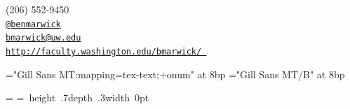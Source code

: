 \documentclass[11pt,article,oneside,oldfontcommands]{memoir}
\makeatletter
\def\myemail{bmarwick@uw.edu}
\def\myweb{http://faculty.washington.edu/bmarwick/ }
\def\myphone{(206) 552-9450}
\def\mytwitter{@benmarwick}
\makeatother
\begin{document}
\begin{minipage}[t]{2.95in}
  
\end{minipage}
\hfill     
\hfill
\begin{minipage}[t]{1.7in}
  \flushright \footnotesize  \addressblock \myphone \, \faPhone \\ 
  {\scriptsize  \texttt{\href{http://twitter.com/benmarwick}{\mytwitter}} \, \faTwitter }  \\ 
  {\scriptsize  \texttt{\href{mailto:\myemail}{\myemail}} \, \faEnvelope} \\
  {\scriptsize  \texttt{\href{\myweb}{\myweb}} \, \faGlobe}
\end{minipage}

\medskip

\reversemarginpar

\bigskip   

\def\mainfont{Gill Sans MT}
\font\bodyfont="\mainfont:mapping=tex-text;+onum" at 8bp \let\tenrm\bodyfont
\font\boldfont="\mainfont/B" at 8bp \let\tenbf\boldfont
\bodyfont

\baselineskip=10bp
\smallskipamount=\baselineskip
{}\baselineskip
\setbox\strutbox=\hbox{%
  \vrule height .7\baselineskip depth .3\baselineskip width 0pt}

\newcount\rowcount

\def\headersfor#1{
  \noalign{\global\rowcount=0 \medbreak}
  \bf #1& LVL& LDR& ATT& DEF& INI& SPD& HP& DMG\crcr
  \noalign{\nobreak\smallskip}}

\def\cr{\crcr\noalign{\maybeskip}}

\def\maybeskip{\ifnum\rowcount=2 \global\rowcount=0 \smallbreak
  \else \global\advance\rowcount by 1 \fi}
\end{document}
